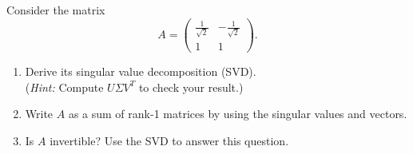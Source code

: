 	Consider the matrix
	$$A = \begin{pmatrix}
	\frac{1}{\sqrt{2}} &-\frac{1}{\sqrt{2}}\\
	1&1
	\end{pmatrix}.$$	
\begin{enumerate}
		\item Derive its singular value decomposition (SVD).\\
	   (\textit{Hint:} Compute $U\Sigma V^T$ to check your result.)
		\item Write $A$ as a sum of rank-1 matrices by using the singular values and vectors.
		\item Is $A$ invertible? Use the SVD to answer this question.
\end{enumerate}
